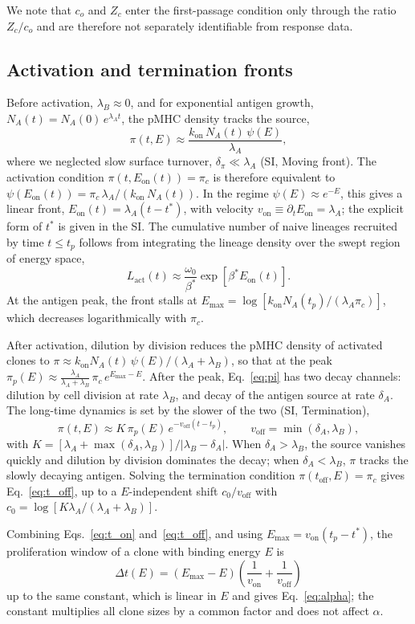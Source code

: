 \documentclass[aps, pre, twocolumn, 10pt, groupedaddress, superscriptaddress, linenumbers]{revtex4-2}
\newcommand{\EQ}{\begin{equation}}
\newcommand{\EE}{\end{equation}}
\newcommand{\on}{\text{on}}
\newcommand{\off}{\text{off}}
\newcommand{\act}{\text{act}}
\newcommand{\DG}{E}
\newcommand{\lam}{\lambda}
\begin{document}
We note that $c_o$ and $Z_c$ enter the first-passage condition only through the
ratio $Z_c/c_o$ and are therefore not separately identifiable from response data.

\subsection*{Activation and termination fronts}
Before activation, $\lam_B \approx 0$, and for exponential antigen growth, $N_A(t) = N_A(0)\,e^{\lam_A t}$, the pMHC density tracks the source,
\EQ
\pi(t, \DG) \approx \frac{k_\on\, N_A(t)\, \psi(\DG)}{\lam_A},
\label{eq:pi_E}
\EE
where we neglected slow surface turnover, $\delta_\pi \ll \lam_A$ (SI, Moving front).
The activation condition $\pi(t, \DG_\on(t)) = \pi_c$ is therefore equivalent to $\psi(\DG_\on(t)) = \pi_c\, \lam_A / (k_\on\, N_A(t))$.
In the regime $\psi(\DG) \approx e^{-\DG}$, this gives a linear front, $\DG_\on(t) = \lam_A (t - t^*)$, with velocity $v_\on \equiv \partial_t \DG_\on = \lam_A$; the explicit form of $t^*$ is given in the SI.
The cumulative number of naive lineages recruited by time $t \leq t_p$ follows from integrating the lineage density over the swept region of energy space,
\EQ
L_\act(t) \approx \frac{\omega_0}{\beta^*} \exp[\beta^* \DG_\on(t)].
\EE
At the antigen peak, the front stalls at $\DG_{\max} = \log[k_\on N_A(t_p)/(\lam_A \pi_c)]$, which decreases logarithmically with $\pi_c$.

After activation, dilution by division reduces the pMHC density of activated clones to $\pi \approx k_\on N_A(t)\,\psi(\DG)/(\lam_A + \lam_B)$, so that at the peak $\pi_p(\DG) \approx \frac{\lam_A}{\lam_A+\lam_B}\,\pi_c\, e^{\DG_{\max} - \DG}$.
After the peak, Eq.~\ref{eq:pi} has two decay channels: dilution by cell division at rate $\lam_B$, and decay of the antigen source at rate $\delta_A$.
The long-time dynamics is set by the slower of the two (SI, Termination),
\EQ
\pi(t, \DG) \approx K\,\pi_p(\DG)\, e^{-v_\off (t - t_p)}, \qquad v_\off = \min(\delta_A, \lam_B),
\EE
with $K = [\lam_A + \max(\delta_A, \lam_B)]/|\lam_B - \delta_A|$.
When $\delta_A > \lam_B$, the source vanishes quickly and dilution by division dominates the decay; when $\delta_A < \lam_B$, $\pi$ tracks the slowly decaying antigen.
Solving the termination condition $\pi(t_\off, \DG) = \pi_c$ gives Eq.~\ref{eq:t_off}, up to a $\DG$-independent shift $c_0/v_\off$ with $c_0 = \log[K\lam_A/(\lam_A + \lam_B)]$.

Combining Eqs.~\ref{eq:t_on} and~\ref{eq:t_off}, and using $\DG_{\max} = v_\on (t_p - t^*)$, the proliferation window of a clone with binding energy $\DG$ is
\EQ
\Delta t(\DG) = (\DG_{\max} - \DG)\left(\frac{1}{v_\on} + \frac{1}{v_\off}\right)
\label{eq:Delta_t_E}
\EE
up to the same constant, which is linear in $\DG$ and gives Eq.~\ref{eq:alpha}; the constant multiplies all clone sizes by a common factor and does not affect $\alpha$.
\end{document}
